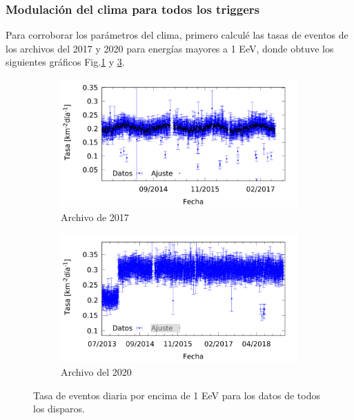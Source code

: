 
      \subsubsection{Modulación del clima para todos los triggers}

      Para corroborar los parámetros del clima, primero calculé las tasas de eventos de los archivos del 2017 y 2020 para energías mayores a 1  EeV, donde obtuve los siguientes gráficos Fig.\ref{fig:rate_daily_2017_1EeV} y \ref{fig:rate_daily_2020_1EeV}. 

        \begin{figure}[H]
        
          \begin{subfigure}[b]{0.5\textwidth}
          \centering
          \includegraphics[width=\textwidth]{../0_Introduccion/daily_rate/daily_rate_AllTriggers_2017_1EeV.png}
          \caption{Archivo de 2017}   \label{fig:rate_daily_2017_1EeV}
          \end{subfigure}%
        \hfill
          \begin{subfigure}[b]{0.5\textwidth}
          \centering
          \includegraphics[width=\textwidth]{../0_Introduccion/daily_rate/daily_rate_AllTriggers_2019_1EeV.png}
          \caption{Archivo del 2020}  \label{fig:rate_daily_2020_1EeV}
          \end{subfigure}
          \caption{Tasa de eventos diaria por encima de 1 EeV para los datos de todos los disparos.}
        \end{figure}

